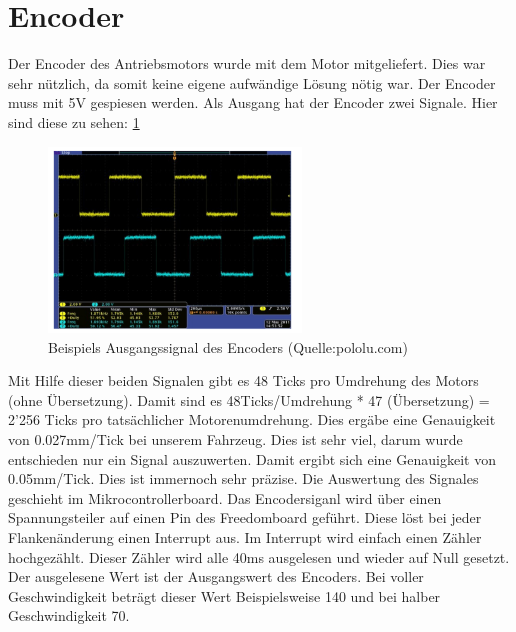 \documentclass[a4paper, 10pt, fleqn]{article}
\begin{document}
\section{Encoder}
Der Encoder des Antriebsmotors wurde mit dem Motor mitgeliefert. Dies war sehr nützlich, da somit keine eigene aufwändige Lösung nötig war. Der Encoder muss mit 5V gespiesen werden. Als Ausgang hat der Encoder zwei Signale. Hier sind diese zu sehen:
\ref{fig:encoder_out}
\begin{figure}[H]%
\centering
\includegraphics[width=0.6\textwidth]{Images/Encoder_Out.PNG}
\caption{Beispiels Ausgangssignal des Encoders (Quelle:pololu.com)}
\label{fig:encoder_out}
\end{figure}
Mit Hilfe dieser beiden Signalen gibt es 48 Ticks pro Umdrehung des Motors (ohne Übersetzung). Damit sind es 48Ticks/Umdrehung * 47 (Übersetzung) = 2'256 Ticks pro tatsächlicher Motorenumdrehung. Dies ergäbe eine Genauigkeit von 0.027mm/Tick bei unserem Fahrzeug. Dies ist sehr viel, darum wurde entschieden nur ein Signal auszuwerten. Damit ergibt sich eine Genauigkeit von 0.05mm/Tick. Dies ist immernoch sehr präzise.
Die Auswertung des Signales geschieht im Mikrocontrollerboard. Das Encodersiganl wird über einen Spannungsteiler auf einen Pin des Freedomboard geführt. Diese löst bei jeder Flankenänderung einen Interrupt aus. Im Interrupt wird einfach einen Zähler hochgezählt. Dieser Zähler wird alle 40ms ausgelesen und wieder auf Null gesetzt. Der ausgelesene Wert ist der Ausgangswert des Encoders. Bei voller Geschwindigkeit beträgt dieser Wert Beispielsweise 140 und bei halber Geschwindigkeit 70.
 
\end{document}
